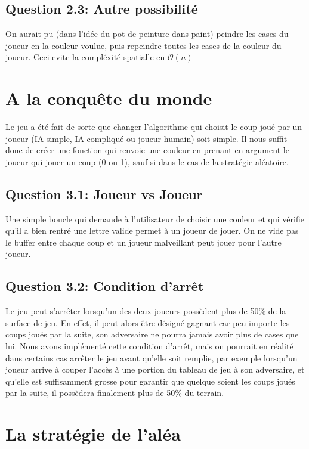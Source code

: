 \documentclass[11pt]{article}
\begin{document}
    \subsection{Question 2.3: Autre possibilité}
    On aurait pu (dans l'idée du pot de peinture dans paint) peindre les cases du joueur en la couleur voulue, puis repeindre toutes les cases de la couleur du joueur. Ceci evite la compléxité spatialle en $\mathcal{O}(n)$

    \section{A la conquête du monde}

    Le jeu a été fait de sorte que changer l'algorithme qui choisit le coup joué par un joueur (IA simple, IA compliqué ou joueur humain) soit simple. Il nous suffit donc de créer une fonction qui renvoie une couleur en prenant en argument le joueur qui jouer un coup (0 ou 1), sauf si dans le cas de la stratégie aléatoire.

    \subsection{Question 3.1: Joueur vs Joueur}

    Une simple boucle qui demande à l'utilisateur de choisir une couleur et qui vérifie qu'il a bien rentré une lettre valide permet à un joueur de jouer. On ne vide pas le buffer entre chaque coup et un joueur malveillant peut jouer pour l'autre joueur.

    \subsection{Question 3.2: Condition d'arrêt}

    Le jeu peut s'arrêter lorsqu'un des deux joueurs possèdent plus de 50\% de la surface de jeu. En effet, il peut alors être désigné gagnant car peu importe les coups joués par la suite, son adversaire ne pourra jamais avoir plus de cases que lui. Nous avons implémenté cette condition d'arrêt, mais on pourrait en réalité dans certains cas arrêter le jeu avant qu'elle soit remplie, par exemple lorsqu'un joueur arrive à couper l'accès à une portion du tableau de jeu à son adversaire, et qu'elle est suffisamment grosse pour garantir que quelque soient les coups joués par la suite, il possèdera finalement plus de 50\% du terrain.

    \section{La stratégie de l'aléa}
\end{document}
